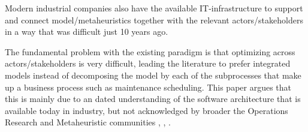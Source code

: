 Modern industrial companies also have the available IT-infrastructure to support
and connect model/metaheuristics together with the relevant actors/stakeholders
in a way that was difficult just 10 years ago.

The fundamental problem with the existing paradigm is that optimizing across
actors/stakeholders is very difficult, leading the literature to prefer
integrated models instead of decomposing the model by each of the
subprocesses that make up a business process such as maintenance scheduling.
This paper argues that this is mainly due to an dated understanding of
the software architecture that is available today in industry, but not
acknowledged by broader the Operations Research and Metaheuristic
communities \citep{talbiMetaheuristicsDesignImplementation2009},
\citep{gendreauHandbookMetaheuristics2019}, \citep{meignanReviewTaxonomyInteractive2015}.

